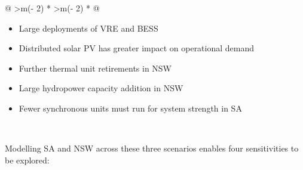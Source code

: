 \documentclass[12pt,a4paper,]{report}
\providecommand{\tightlist}{%
  \setlength{\itemsep}{0pt}\setlength{\parskip}{0pt}}
\begin{document}
\begin{longtable}[]{@{}
  >{\centering\arraybackslash}m{(\columnwidth - 2\tabcolsep) * }
  >{\centering\arraybackslash}m{(\columnwidth - 2\tabcolsep) * }@{}}
\begin{minipage}[t]{\linewidth}
\begin{itemize}
  \begin{itemize}
  \tightlist
  \item
    Large deployments of VRE and BESS
  \item
    Distributed solar PV has greater impact on operational demand
  \item
    Further thermal unit retirements in NSW
  \item
    Large hydropower capacity addition in NSW
  \item
    Fewer synchronous units must run for system strength in SA
  \end{itemize}
\end{itemize}
\end{minipage} \\
\end{longtable}

Modelling SA and NSW across these three scenarios enables four
sensitivities to be explored:
\end{document}
